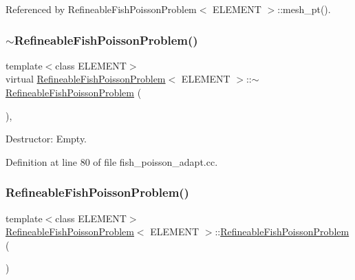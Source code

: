 Referenced by Refineable\+Fish\+Poisson\+Problem$<$ E\+L\+E\+M\+E\+N\+T $>$\+::mesh\+\_\+pt().

\mbox{\label{classRefineableFishPoissonProblem_a4a5e7c5f264364211ad641353933c222}} 
\subsubsection{\texorpdfstring{$\sim$\+Refineable\+Fish\+Poisson\+Problem()}{~RefineableFishPoissonProblem()}\hspace{0.1cm}{\footnotesize\ttfamily [1/2]}}
{\footnotesize\ttfamily template$<$class E\+L\+E\+M\+E\+NT$>$ \\
virtual \hyperlink{classRefineableFishPoissonProblem}{Refineable\+Fish\+Poisson\+Problem}$<$ E\+L\+E\+M\+E\+NT $>$\+::$\sim$\hyperlink{classRefineableFishPoissonProblem}{Refineable\+Fish\+Poisson\+Problem} (\begin{DoxyParamCaption}{ }\end{DoxyParamCaption})\hspace{0.3cm}{\ttfamily [inline]}, {\ttfamily [virtual]}}



Destructor\+: Empty. 



Definition at line 80 of file fish\+\_\+poisson\+\_\+adapt.\+cc.

\mbox{\label{classRefineableFishPoissonProblem_a7a9c8258a867de6b3c8b9d00a7c965f1}} 
\subsubsection{\texorpdfstring{Refineable\+Fish\+Poisson\+Problem()}{RefineableFishPoissonProblem()}\hspace{0.1cm}{\footnotesize\ttfamily [2/2]}}
{\footnotesize\ttfamily template$<$class E\+L\+E\+M\+E\+NT$>$ \\
\hyperlink{classRefineableFishPoissonProblem}{Refineable\+Fish\+Poisson\+Problem}$<$ E\+L\+E\+M\+E\+NT $>$\+::\hyperlink{classRefineableFishPoissonProblem}{Refineable\+Fish\+Poisson\+Problem} (\begin{DoxyParamCaption}{ }\end{DoxyParamCaption})}



